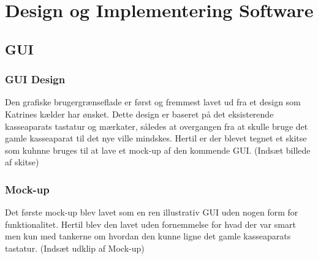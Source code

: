 \section{Design og Implementering Software}

\subsection{GUI}
\subsubsection{GUI Design}
Den grafiske brugergrænseflade er først og fremmest lavet ud fra et design som Katrines kælder
har ønsket. Dette design er baseret på det eksisterende kasseaparats tastatur og mærkater,
således at overgangen fra at skulle bruge det gamle kasseaparat til det nye ville mindskes.
\newline
\newline
Hertil er der blevet tegnet et skitse som kuhnne bruges til at lave et mock-up af den kommende GUI.
\newline
\newline
(Indsæt billede af skitse)
\newline
\newline
\subsubsection{Mock-up}
Det første mock-up blev lavet som en ren illustrativ GUI uden nogen form for funktionalitet. 
Hertil blev den lavet uden fornemmelse for hvad der var smart men kun med tankerne om 
hvordan den kunne ligne det gamle kasseaparats tastatur. 
\newline
\newline
(Indsæt udklip af Mock-up)
\newline
\newline
